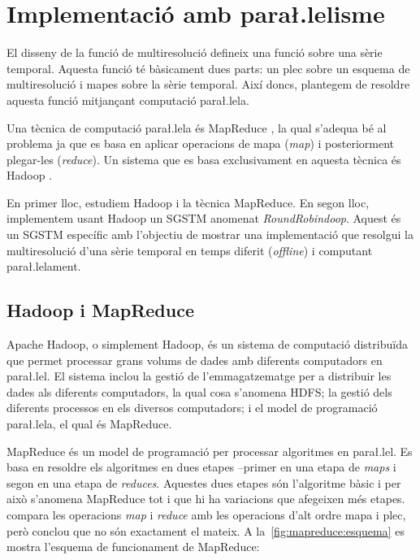 \chapter{Implementació amb para\l.lelisme}


El disseny de la funció de multiresolució 
defineix una funció sobre una sèrie temporal. Aquesta funció té
bàsicament dues parts: un plec sobre un esquema de multiresolució i
mapes sobre la sèrie temporal. Així doncs, plantegem de resoldre
aquesta funció mitjançant computació para\l.lela. 


Una tècnica de computació para\l.lela és
MapReduce \parencite{deanghemawat04:mapreduce}, la qual s'adequa bé al
problema ja que es basa en aplicar operacions de mapa (\emph{map}) i
posteriorment plegar-les (\emph{reduce}). Un sistema que es basa
exclusivament en aquesta tècnica és
Hadoop \parencite{hadoop}.


En primer lloc, estudiem Hadoop i la tècnica MapReduce.  En segon
lloc, implementem usant Hadoop un \gls{SGSTM} anomenat
\emph{RoundRobindoop}. Aquest és un \gls{SGSTM} específic amb
l'objectiu de mostrar una implementació que resolgui la multiresolució
d'una sèrie temporal en temps diferit (\emph{offline}) i computant
para\l.lelament.




\section{Hadoop i MapReduce}


Apache Hadoop, o simplement Hadoop, \parencite{hadoop} és un sistema
de computació distribuïda que permet processar grans volums de dades
amb diferents computadors en para\l.lel. El sistema inclou la gestió
de l'emmagatzematge per a distribuir les dades als diferents
computadors, la qual cosa s'anomena \gls{HDFS}; la gestió dels
diferents processos en els diversos computadors; i el model de
programació para\l.lela, el qual és MapReduce.


MapReduce \parencite{deanghemawat04:mapreduce,lammel08:mapreduce} és
un model de programació per processar algoritmes en para\l.lel. Es
basa en resoldre els algoritmes en dues etapes --primer en una etapa
de \emph{maps} i segon en una etapa de \emph{reduces}.  Aquestes dues
etapes són l'algoritme bàsic i per això s'anomena MapReduce tot i que
hi ha variacions que afegeixen més etapes.
\textcite{lammel08:mapreduce} compara les operacions \emph{map} i
\emph{reduce} amb les operacions d'alt ordre mapa i plec, però conclou
que no són exactament el mateix.  A la~\autoref{fig:mapreduce:esquema}
es mostra l'esquema de funcionament de MapReduce:


